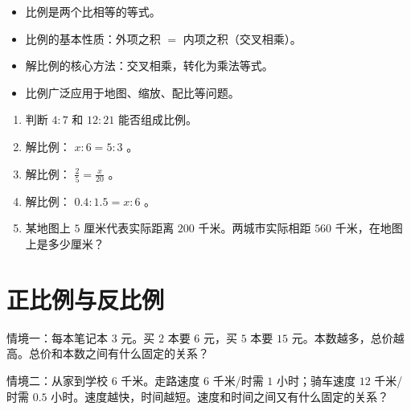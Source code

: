 \begin{keytakeaway}


\begin{itemize}
  \item 比例是两个比相等的等式。
  \item 比例的基本性质：外项之积 $=$ 内项之积（交叉相乘）。
  \item 解比例的核心方法：交叉相乘，转化为乘法等式。
  \item 比例广泛应用于地图、缩放、配比等问题。
\end{itemize}


\end{keytakeaway}

\begin{practice}


\begin{enumerate}
  \item 判断 $4 : 7$ 和 $12 : 21$ 能否组成比例。
  \item 解比例： $x : 6 = 5 : 3$ 。
  \item 解比例： $\frac{2}{5} = \frac{x}{20}$ 。
  \item 解比例： $0.4 : 1.5 = x : 6$ 。
  \item 某地图上 $5$ 厘米代表实际距离 $200$ 千米。两城市实际相距 $560$ 千米，在地图上是多少厘米？
\end{enumerate}


\end{practice}

\section*{正比例与反比例}


\begin{explore}


情境一：每本笔记本 $3$ 元。买 $2$ 本要 $6$ 元，买 $5$ 本要 $15$ 元。本数越多，总价越高。总价和本数之间有什么固定的关系？

情境二：从家到学校 $6$ 千米。走路速度 $6$ 千米/时需 $1$ 小时；骑车速度 $12$ 千米/时需 $0.5$ 小时。速度越快，时间越短。速度和时间之间又有什么固定的关系？

\end{explore}

